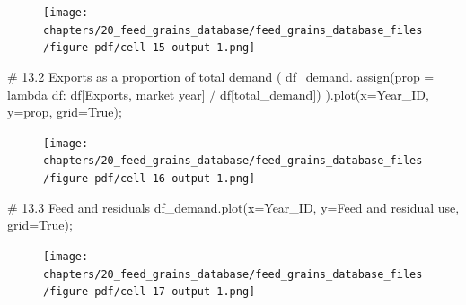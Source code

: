 \documentclass[
  letterpaper,
  DIV=11,
  numbers=noendperiod]{scrreprt}
\newenvironment{Shaded}{\begin{snugshade}}{\end{snugshade}}
\newcommand{\CommentTok}[1]{\textcolor[rgb]{0.37,0.37,0.37}{#1}}
\newcommand{\KeywordTok}[1]{\textcolor[rgb]{0.00,0.23,0.31}{#1}}
\newcommand{\NormalTok}[1]{\textcolor[rgb]{0.00,0.23,0.31}{#1}}
\newcommand{\OperatorTok}[1]{\textcolor[rgb]{0.37,0.37,0.37}{#1}}
\newcommand{\StringTok}[1]{\textcolor[rgb]{0.13,0.47,0.30}{#1}}
\newcommand{\VariableTok}[1]{\textcolor[rgb]{0.07,0.07,0.07}{#1}}
\begin{document}
\begin{figure}[H]

{\centering \texttt{[image: chapters/20\_feed\_grains\_database/feed\_grains\_database\_files/figure-pdf/cell-15-output-1.png]}

}

\end{figure}

\begin{Shaded}
\begin{Highlighting}[]
\CommentTok{\# 13.2 Exports as a proportion of total demand}
\NormalTok{(}
\NormalTok{df\_demand.}
\NormalTok{    assign(prop }\OperatorTok{=} \KeywordTok{lambda}\NormalTok{ df: df[}\StringTok{\textquotesingle{}Exports, market year\textquotesingle{}}\NormalTok{] }\OperatorTok{/}\NormalTok{ df[}\StringTok{\textquotesingle{}total\_demand\textquotesingle{}}\NormalTok{])}
\NormalTok{).plot(x}\OperatorTok{=}\StringTok{\textquotesingle{}Year\_ID\textquotesingle{}}\NormalTok{, y}\OperatorTok{=}\StringTok{\textquotesingle{}prop\textquotesingle{}}\NormalTok{, grid}\OperatorTok{=}\VariableTok{True}\NormalTok{)}\OperatorTok{;}
\end{Highlighting}
\end{Shaded}

\begin{figure}[H]

{\centering \texttt{[image: chapters/20\_feed\_grains\_database/feed\_grains\_database\_files/figure-pdf/cell-16-output-1.png]}

}

\end{figure}

\begin{Shaded}
\begin{Highlighting}[]
\CommentTok{\# 13.3 Feed and residuals}
\NormalTok{df\_demand.plot(x}\OperatorTok{=}\StringTok{\textquotesingle{}Year\_ID\textquotesingle{}}\NormalTok{, y}\OperatorTok{=}\StringTok{\textquotesingle{}Feed and residual use\textquotesingle{}}\NormalTok{, grid}\OperatorTok{=}\VariableTok{True}\NormalTok{)}\OperatorTok{;}
\end{Highlighting}
\end{Shaded}

\begin{figure}[H]

{\centering \texttt{[image: chapters/20\_feed\_grains\_database/feed\_grains\_database\_files/figure-pdf/cell-17-output-1.png]}

}

\end{figure}
\end{document}

